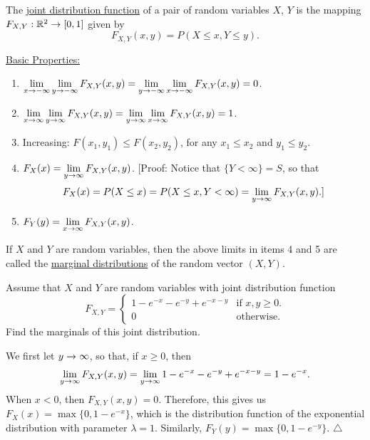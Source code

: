 \begin{definition}
The \underline{joint distribution function} of a pair of random variables $X$, $Y$ is the mapping $F_{X, Y} : \mathbb{R}^2 \rightarrow [0, 1]$ given by
    \[
        F_{X, Y} (x, y) = P (X \leq x , Y \leq y ) .
    \]
\end{definition}

\underline{Basic Properties:}
    \begin{enumerate}[label=\arabic*)]
        \item $\displaystyle \lim_{x \rightarrow -\infty} \lim_{y \rightarrow -\infty} F_{X, Y} (x, y) = \lim_{y \rightarrow -\infty} \lim_{x \rightarrow -\infty} F_{X, Y} (x, y) = 0$.
        \item $\displaystyle\lim_{x \rightarrow \infty} \lim_{y \rightarrow \infty} F_{X, Y} (x, y) = \lim_{y \rightarrow \infty} \lim_{x \rightarrow \infty} F_{X, Y} (x, y) = 1$.
        \item Increasing: $F(x_1, y_1) \leq F(x_2, y_2)$, for any $x_1 \leq x_2$ and $y_1 \leq y_2$.
        \item\label{P:MarginalInX}$F_X (x) = \displaystyle \lim_{y \rightarrow \infty} F_{X, Y} (x, y)$. [Proof: Notice that $\{ Y < \infty \} = S$, so that
        \[
            F_X (x) = P (X \leq x ) = P (X \leq x , Y < \infty ) = \lim_{y \rightarrow \infty} F_{X, Y} (x, y) .]
        \]
        \item\label{P:MarginalInY} $F_Y (y) = \displaystyle \lim_{x \rightarrow \infty} F_{X, Y} (x, y)$.
    \end{enumerate}

\begin{definition}
If $X$ and $Y$ are random variables, then the above limits in items 4 and 5 are called the \underline{marginal distributions} of the random vector $(X, Y)$.
\end{definition}

\begin{example}
Assume that $X$ and $Y$ are random variables with joint distribution function
    \[
        F_{X, Y} = \left\lbrace \begin{matrix} 1 - e^{-x} - e^{-y} + e^{-x-y} & \text{if } x, y \geq 0 .\\
        0 & \text{otherwise.} \end{matrix} \right. 
    \]
Find the marginals of this joint distribution.
\end{example}

\begin{sol*}
We first let $y \rightarrow \infty$, so that, if $x \geq 0$, then 
    \[
        \lim_{y \rightarrow \infty} F_{X, Y} (x, y) = \lim_{y \rightarrow \infty} 1 - e^{-x} - e^{-y} + e^{-x - y} = 1 - e^{-x} .
    \]
When $x < 0$, then $F_{X, Y} (x, y) = 0$. Therefore, this gives us $F_X (x) = \max \{ 0 , 1 - e^{-x} \}$, which is the distribution function of the exponential distribution with parameter $\lambda = 1$. Similarly, $F_Y (y) = \max\{ 0, 1 - e^{-y} \}$. \hfill $\triangle$
\end{sol*}

